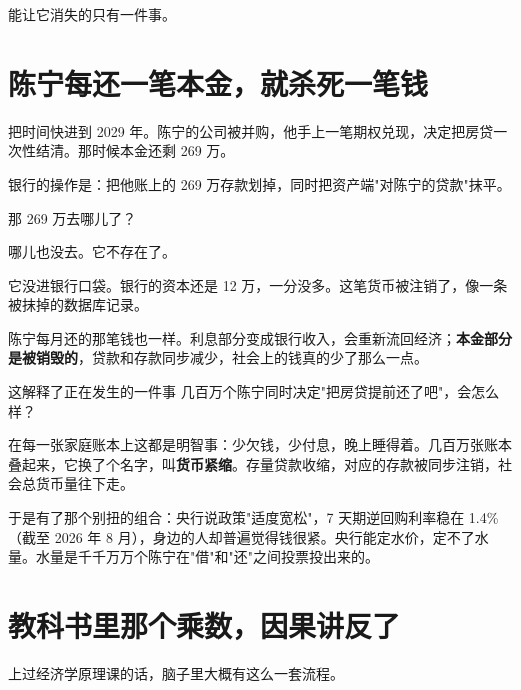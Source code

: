 能让它消失的只有一件事。

\section{陈宁每还一笔本金，就杀死一笔钱}

把时间快进到 2029 年。陈宁的公司被并购，他手上一笔期权兑现，决定把房贷一次性结清。那时候本金还剩 269 万。

银行的操作是：把他账上的 269 万存款划掉，同时把资产端"对陈宁的贷款"抹平。

\begin{bsheet}
\end{bsheet}

那 269 万去哪儿了？

哪儿也没去。它不存在了。

它没进银行口袋。银行的资本还是 12 万，一分没多。这笔货币被注销了，像一条被抹掉的数据库记录。

陈宁每月还的那笔钱也一样。利息部分变成银行收入，会重新流回经济；\textbf{本金部分是被销毁的}，贷款和存款同步减少，社会上的钱真的少了那么一点。

\begin{databox}{这解释了正在发生的一件事}
几百万个陈宁同时决定"把房贷提前还了吧"，会怎么样？

在每一张家庭账本上这都是明智事：少欠钱，少付息，晚上睡得着。几百万张账本叠起来，它换了个名字，叫\textbf{货币紧缩}。存量贷款收缩，对应的存款被同步注销，社会总货币量往下走。

于是有了那个别扭的组合：央行说政策"适度宽松"，7 天期逆回购利率稳在 1.4\%（截至 2026 年 8 月），身边的人却普遍觉得钱很紧。央行能定水价，定不了水量。水量是千千万万个陈宁在"借"和"还"之间投票投出来的。

\end{databox}

\section{教科书里那个乘数，因果讲反了}

上过经济学原理课的话，脑子里大概有这么一套流程。

\begin{chainflow}
\chainarrow {}\chainarrow {}\chainarrow {}\chainarrow {}\chainarrow {}
\end{chainflow}

